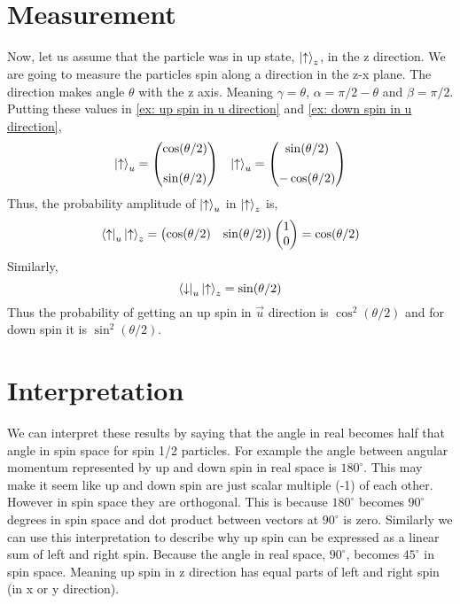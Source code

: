 \documentclass[a4paper, 12pt]{article}
\renewcommand{\indent}{\hspace{3ex}}
\begin{document}
\section{Measurement}
\indent Now, let us assume that the particle was in up state, $\ket{\uparrow}_z$, in the z direction. We are going to measure the particles spin along a direction in the z-x plane. The direction makes angle $\theta$ with the z axis. Meaning $\gamma = \theta$, $\alpha = \pi/2 - \theta$ and $\beta = \pi / 2$. Putting these values in \eqref{ex: up spin in u direction} and \eqref{ex: down spin in u direction},
\begin{align*}
	\ket{\uparrow}_u = \begin{pmatrix} \cos (\theta/2) \\\\ \sin(\theta/2) \end{pmatrix} && \ket{\uparrow}_u = \begin{pmatrix} \sin (\theta/2) \\\\ - \cos(\theta/2) \end{pmatrix}
\end{align*}
Thus, the probability amplitude of $\ket{\uparrow}_u$ in $\ket{\uparrow}_z$ is,
\begin{equation*}
	\bra{\uparrow}_u \ket{\uparrow}_z = \begin{pmatrix} \cos (\theta/2) & \sin(\theta/2) \end{pmatrix} \begin{pmatrix} 1 \\ 0 \end{pmatrix} = \cos (\theta/2)
\end{equation*}
Similarly,
\begin{equation*}
	\bra{\downarrow}_u \ket{\uparrow}_z = \sin (\theta/2)
\end{equation*}
\indent Thus the probability of getting an up spin in $\vec u$ direction is $\cos^2(\theta/2)$ and for down spin it is $\sin^2 (\theta/2)$.

\section{Interpretation}
\indent We can interpret these results by saying that the angle in real becomes half that angle in spin space for spin 1/2 particles. For example the angle between angular momentum represented by up and down spin in real space is $180^\circ$. This may make it seem like up and down spin are just scalar multiple (-1) of each other. However in spin space they are orthogonal. This is because $180^\circ$ becomes $90^\circ$ degrees in spin space and dot product between vectors at $90^\circ$ is zero. Similarly we can use this interpretation to describe why up spin can be expressed as a linear sum of left and right spin. Because the angle in real space, $90^\circ$, becomes $45^\circ$ in spin space. Meaning up spin in z direction has equal parts of left and right spin (in x or y direction).

 
\end{document}
